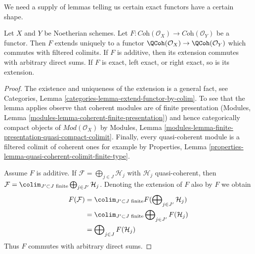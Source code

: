 \noindent
We need a supply of lemmas telling us certain exact functors have
a certain shape.

\begin{lemma}
\label{lemma-functor-coherent}
Let $X$ and $Y$ be Noetherian schemes. Let
$F : \textit{Coh}(\mathcal{O}_X) \to \textit{Coh}(\mathcal{O}_Y)$
be a functor. Then $F$ extends uniquely to a functor
$\QCoh(\mathcal{O}_X) \to \QCoh(\mathcal{O}_Y)$
which commutes with filtered colimits.
If $F$ is additive, then its extension commutes with arbitrary direct sums.
If $F$ is exact, left exact, or right exact, so is its extension.
\end{lemma}

\begin{proof}
The existence and uniqueness of the extension is a general fact, see
Categories, Lemma \ref{categories-lemma-extend-functor-by-colim}.
To see that the lemma applies observe that coherent modules
are of finite presentation
(Modules, Lemma \ref{modules-lemma-coherent-finite-presentation}) and hence
categorically compact objects of $\textit{Mod}(\mathcal{O}_X)$ by
Modules, Lemma \ref{modules-lemma-finite-presentation-quasi-compact-colimit}.
Finally, every quasi-coherent module is a filtered colimit
of coherent ones for example by
Properties, Lemma \ref{properties-lemma-quasi-coherent-colimit-finite-type}.

\medskip\noindent
Assume $F$ is additive. If $\mathcal{F} = \bigoplus_{j \in J} \mathcal{H}_j$
with $\mathcal{H}_j$ quasi-coherent, then
$\mathcal{F} = \colim_{J' \subset J\text{ finite}}
\bigoplus_{j \in J'} \mathcal{H}_j$.
Denoting the extension of $F$ also by $F$ we obtain
\begin{align*}
F(\mathcal{F})
& =
\colim_{J' \subset J\text{ finite}}
F(\bigoplus\nolimits_{j \in J'} \mathcal{H}_j) \\
& =
\colim_{J' \subset J\text{ finite}}
\bigoplus\nolimits_{j \in J'} F(\mathcal{H}_j) \\
& =
\bigoplus\nolimits_{j \in J} F(\mathcal{H}_j)
\end{align*}
Thus $F$ commutes with arbitrary direct sums.


\end{proof}
